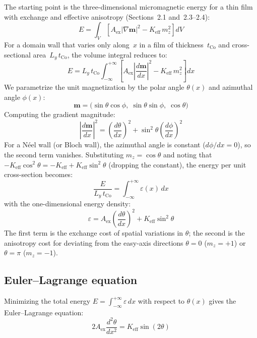 \documentclass[11pt,a4paper]{article}
\newcommand{\mb}[1]{\mathbf{#1}}
\newcommand{\tCo}{t_{\text{Co}}}
\newcommand{\Keff}{K_{\text{eff}}}
\newcommand{\Aex}{A_{\text{ex}}}
\begin{document}
The starting point is the three-dimensional micromagnetic energy for
a thin film with exchange and effective anisotropy (Sections~2.1
and~2.3--2.4):
%
\begin{equation}
E = \int_V \left[
    \Aex \left|\nabla \mb{m}\right|^2
    - \Keff \, m_z^2
\right] dV
\end{equation}
%
For a domain wall that varies only along~$x$ in a film of
thickness~$\tCo$ and cross-sectional area~$L_y \, \tCo$, the volume
integral reduces to:
%
\begin{equation}
E = L_y \, \tCo \int_{-\infty}^{+\infty} \left[
    \Aex \left|\frac{d\mb{m}}{dx}\right|^2
    - \Keff \, m_z^2
\right] dx
\end{equation}
%
We parametrize the unit magnetization by the polar angle
$\theta(x)$ and azimuthal angle $\phi(x)$:
%
\begin{equation}
\mb{m} = \big(
    \sin\theta\cos\phi, \;
    \sin\theta\sin\phi, \;
    \cos\theta
\big)
\end{equation}
%
Computing the gradient magnitude:
%
\begin{equation}
\left|\frac{d\mb{m}}{dx}\right|^2
    = \left(\frac{d\theta}{dx}\right)^{\!2}
    + \sin^2\!\theta
      \left(\frac{d\phi}{dx}\right)^{\!2}
\end{equation}
%
For a N\'{e}el wall (or Bloch wall), the azimuthal angle is
constant ($d\phi/dx = 0$), so the second term vanishes.
Substituting $m_z = \cos\theta$ and noting that
$-\Keff \cos^2\!\theta = -\Keff + \Keff \sin^2\!\theta$
(dropping the constant), the energy per unit cross-section becomes:
%
\begin{equation}
\frac{E}{L_y \, \tCo}
    = \int_{-\infty}^{+\infty} \varepsilon(x) \, dx
\end{equation}
%
with the one-dimensional energy density:
%
\begin{equation}\label{eq:dw_energy}
\boxed{\;
\varepsilon = \Aex
    \left(\frac{d\theta}{dx}\right)^{\!2}
    + \Keff \sin^2\!\theta
\;}
\end{equation}
%
The first term is the exchange cost of spatial variations in
$\theta$; the second is the anisotropy cost for deviating from the
easy-axis directions $\theta = 0$ ($m_z = +1$) or $\theta = \pi$
($m_z = -1$).

\subsection*{Euler--Lagrange equation}

Minimizing the total energy
$E = \int_{-\infty}^{+\infty} \varepsilon \, dx$
with respect to $\theta(x)$ gives the Euler--Lagrange equation:
%
\begin{equation}\label{eq:dw_EL}
2\Aex \frac{d^2\theta}{dx^2} = \Keff \sin(2\theta)
\end{equation}
\end{document}
